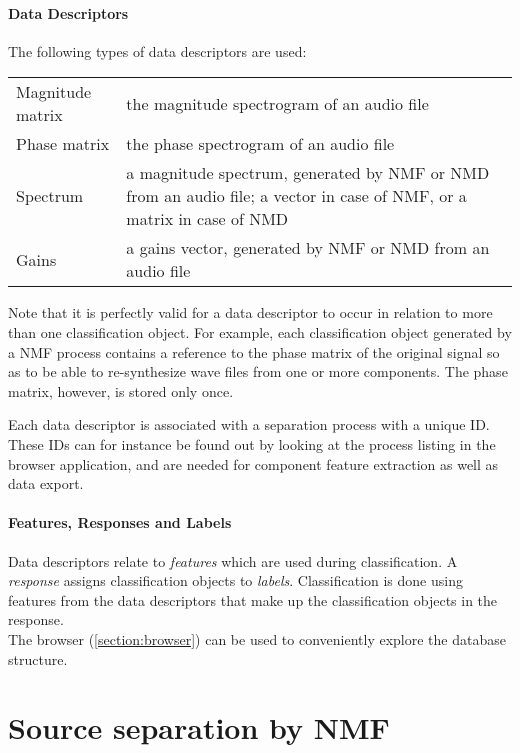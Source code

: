 \paragraph{Data Descriptors} The following types of data descriptors are used:
\begin{center}
  \begin{tabular}{|p{}|p{}|}
    \hline
    Magnitude matrix & the magnitude spectrogram of an audio file \\
    Phase matrix & the phase spectrogram of an audio file \\
    Spectrum & a magnitude spectrum, generated by NMF or NMD from an audio file; a vector in case of NMF, or a matrix in case of NMD \\
    Gains & a gains vector, generated by NMF or NMD from an audio file \\
    \hline
  \end{tabular}
\end{center}
Note that it is perfectly valid for a data descriptor to occur in relation to
more than one classification object. For example, each classification object
generated by a NMF process contains a reference to the phase matrix of the
original signal so as to be able to re-synthesize wave files from one or more
components. The phase matrix, however, is stored only once.

Each data descriptor is associated with a separation process with a unique ID.
These IDs can for instance be found out by looking at the process listing in
the browser application, and are needed for component feature extraction
as well as data export.

\paragraph{Features, Responses and Labels} Data descriptors relate to
\emph{features} which are used during classification. A \emph{response} assigns
classification objects to \emph{labels}. Classification is done using features
from the data descriptors that make up the classification objects in the
response.\\

\noindent The browser (\ref{section:browser}) can be used to conveniently
explore the database structure.



\section{Source separation by NMF}


